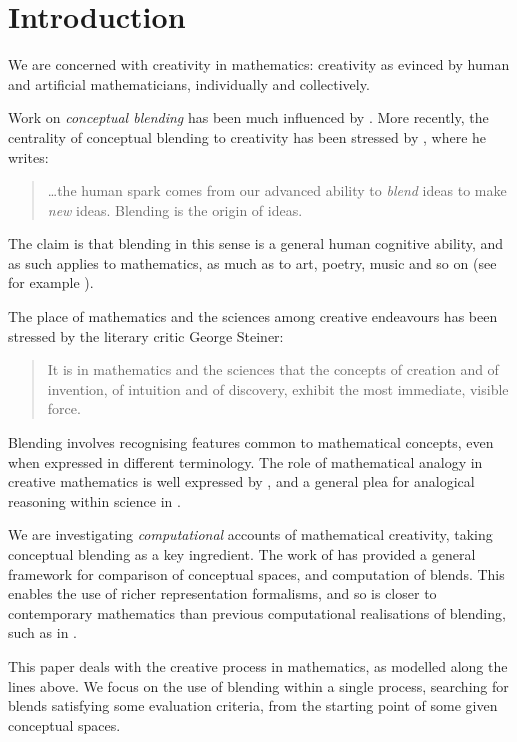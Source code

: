 \section{Introduction}
\label{sec:intro}

We are concerned with creativity in mathematics: creativity
as evinced by human and artificial mathematicians,
individually and collectively.

Work on \emph{conceptual blending} has been much influenced
by \textcite{Fau98,FaTu02}.
More recently, the centrality of conceptual blending to creativity
has been stressed by \textcite{MTurner14}, where he writes:
\begin{quote}
  \dots the human spark comes from our advanced ability to \emph{blend} ideas
  to make \emph{new} ideas. Blending is the origin of ideas.%
  \hfill \parencite[p 2]{MTurner14}
\end{quote}
The claim is that blending in this sense is a general human cognitive
ability, and as such applies to mathematics, as much as to art, poetry,
music and so on (see for example \textcite{MTurner05}).

The place of mathematics and the sciences among creative endeavours
has been stressed by the literary critic George Steiner:
\begin{quote}
  It is in mathematics and the sciences that the concepts of
creation and of invention, of intuition and of discovery,
exhibit the most immediate, visible force.
\end{quote}
Blending involves recognising features common
to mathematical concepts, even when expressed in different
terminology.  The role of mathematical analogy in creative mathematics
is well expressed by \textcite{Weil60}, and a general plea for
analogical reasoning within science in \cite{ArbibHesse86}.

We are investigating \emph{computational} accounts of mathematical
creativity, taking conceptual blending as a key ingredient.  The work
of \textcite{Gog99,Gog05b} 
has provided a general framework for
comparison of conceptual spaces, and computation of blends.  This
enables the use of richer representation formalisms, and so is closer to
contemporary mathematics than previous computational realisations of
blending, such as in \textcite{Pereira2007}.

This paper deals with the creative process in mathematics, as modelled
along the lines above. We focus on the use of blending within a single
process, searching for blends satisfying some evaluation criteria,
from the starting point of some given conceptual spaces.

